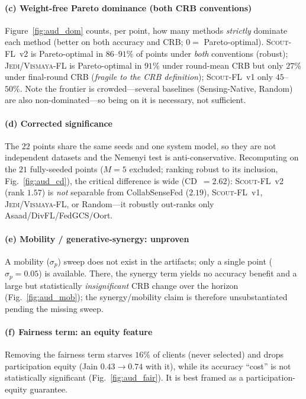 \documentclass[journal,onecolumn,11pt]{IEEEtran}
\newcommand{\jedi}{\textsc{Jedi/Vismaya-FL}}
\newcommand{\scout}{\textsc{Scout-FL}}
\begin{document}
\paragraph{(c) Weight-free Pareto dominance (both CRB conventions)}
Figure~\ref{fig:aud_dom} counts, per point, how many methods \emph{strictly} dominate each
method (better on both accuracy and CRB; $0=$ Pareto-optimal). \scout{}~v2 is Pareto-optimal
in $86$--$91\%$ of points under \emph{both} conventions (robust); \jedi{} is Pareto-optimal in
$91\%$ under round-mean CRB but only $27\%$ under final-round CRB (\emph{fragile to the CRB
definition}); \scout{}~v1 only $45$--$50\%$. Note the frontier is crowded---several baselines
(Sensing-Native, Random) are also non-dominated---so being on it is necessary, not sufficient.

\paragraph{(d) Corrected significance}
The $22$ points share the same seeds and one system model, so they are not independent
datasets and the Nemenyi test is anti-conservative. Recomputing on the $21$ fully-seeded
points ($M{=}5$ excluded; ranking robust to its inclusion, Fig.~\ref{fig:aud_cd}), the
critical difference is wide (CD~$=2.62$): \scout{}~v2 (rank $1.57$) is \emph{not} separable
from CollabSenseFed ($2.19$), \scout{}~v1, \jedi{}, or Random---it robustly out-ranks only
Asaad/DivFL/FedGCS/Oort.

\paragraph{(e) Mobility / generative-synergy: unproven}
A mobility ($\sigma_p$) sweep does not exist in the artifacts; only a single point
($\sigma_p{=}0.05$) is available. There, the synergy term yields no accuracy benefit and a
large but statistically \emph{insignificant} CRB change over the horizon
(Fig.~\ref{fig:aud_mob}); the synergy/mobility claim is therefore unsubstantiated pending the
missing sweep.

\paragraph{(f) Fairness term: an equity feature}
Removing the fairness term starves $16\%$ of clients (never selected) and drops participation
equity (Jain $0.43\!\to\!0.74$ with it), while its accuracy ``cost'' is not statistically
significant (Fig.~\ref{fig:aud_fair}). It is best framed as a participation-equity guarantee.
\end{document}

